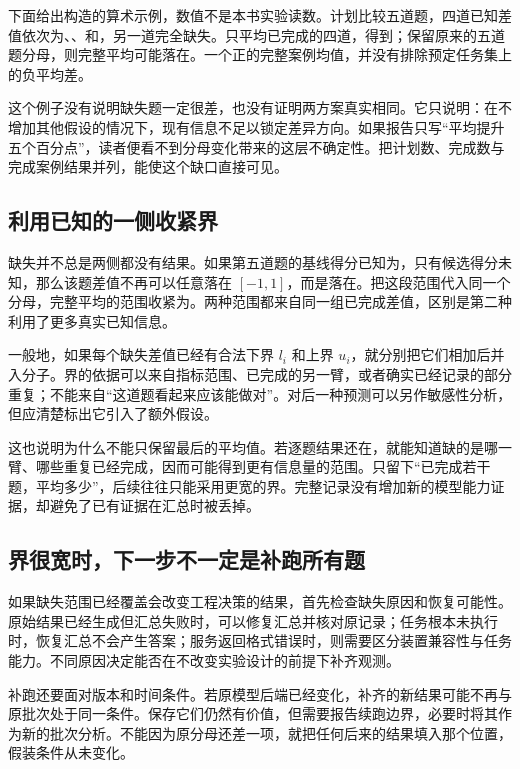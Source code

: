 下面给出构造的算术示例，数值不是本书实验读数。计划比较五道题，四道已知差值依次为、、和，另一道完全缺失。只平均已完成的四道，得到；保留原来的五道题分母，则完整平均可能落在\calcnum{$[-0.16,0.24]$}。一个正的完整案例均值，并没有排除预定任务集上的负平均差。

这个例子没有说明缺失题一定很差，也没有证明两方案真实相同。它只说明：在不增加其他假设的情况下，现有信息不足以锁定差异方向。如果报告只写“平均提升五个百分点”，读者便看不到分母变化带来的这层不确定性。把计划数、完成数与完成案例结果并列，能使这个缺口直接可见。

\subsection{利用已知的一侧收紧界}

缺失并不总是两侧都没有结果。如果第五道题的基线得分已知为，只有候选得分未知，那么该题差值不再可以任意落在 $[-1,1]$，而是落在\calcnum{$[-0.6,0.4]$}。把这段范围代入同一个分母，完整平均的范围收紧为\calcnum{$[-0.08,0.12]$}。两种范围都来自同一组已完成差值，区别是第二种利用了更多真实已知信息。

一般地，如果每个缺失差值已经有合法下界 $l_i$ 和上界 $u_i$，就分别把它们相加后并入分子。界的依据可以来自指标范围、已完成的另一臂，或者确实已经记录的部分重复；不能来自“这道题看起来应该能做对”。对后一种预测可以另作敏感性分析，但应清楚标出它引入了额外假设。

这也说明为什么不能只保留最后的平均值。若逐题结果还在，就能知道缺的是哪一臂、哪些重复已经完成，因而可能得到更有信息量的范围。只留下“已完成若干题，平均多少”，后续往往只能采用更宽的界。完整记录没有增加新的模型能力证据，却避免了已有证据在汇总时被丢掉。

\subsection{界很宽时，下一步不一定是补跑所有题}

如果缺失范围已经覆盖会改变工程决策的结果，首先检查缺失原因和恢复可能性。原始结果已经生成但汇总失败时，可以修复汇总并核对原记录；任务根本未执行时，恢复汇总不会产生答案；服务返回格式错误时，则需要区分装置兼容性与任务能力。不同原因决定能否在不改变实验设计的前提下补齐观测。

补跑还要面对版本和时间条件。若原模型后端已经变化，补齐的新结果可能不再与原批次处于同一条件。保存它们仍然有价值，但需要报告续跑边界，必要时将其作为新的批次分析。不能因为原分母还差一项，就把任何后来的结果填入那个位置，假装条件从未变化。

